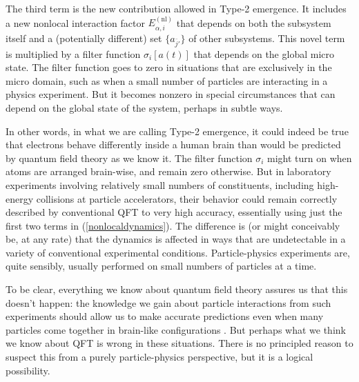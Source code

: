 \documentclass[12pt,english]{article}
\newcommand{\autocite}{\cite}
\begin{document}
The third term is the new contribution allowed in Type-2 emergence.
It includes a new nonlocal interaction factor $E_{\alpha,i}^{(\mathrm{nl})}$ that depends on both the subsystem itself and a (potentially different) set $\{a_{\bar{j}'}\}$ of other subsystems. 
This novel term is multiplied by a filter function $\sigma_i[a(t)]$ that depends on the global micro state.
The filter function goes to zero in situations that are exclusively in the micro domain, such as when a small number of particles are interacting in a physics experiment.
But it becomes nonzero in special circumstances that can depend on the global state of the system, perhaps in subtle ways.

In other words, in what we are calling Type-2 emergence, it could indeed be true that electrons behave differently inside a human brain than would be predicted by quantum field theory as we know it. 
The filter function $\sigma_i$ might turn on when atoms are arranged brain-wise, and remain zero otherwise.
But in laboratory experiments involving relatively small numbers of constituents, including high-energy collisions at particle accelerators, their behavior could remain correctly described by conventional QFT to very high accuracy, essentially using just the first two terms in (\ref{nonlocaldynamics}).
The difference is (or might conceivably be, at any rate) that the dynamics is affected in ways that are undetectable in a variety of conventional experimental conditions.
Particle-physics experiments are, quite sensibly, usually performed on small numbers of particles at a time.

To be clear, everything we know about quantum field theory assures us that this doesn't happen: the knowledge we gain about particle interactions from such experiments should allow us to make accurate predictions even when many particles come together in brain-like configurations \autocite{carroll2021consciousness,carroll2022quantum}.
But perhaps what we think we know about QFT is wrong in these situations.
There is no principled reason to suspect this from a purely particle-physics perspective, but it is a logical possibility.
\end{document}
